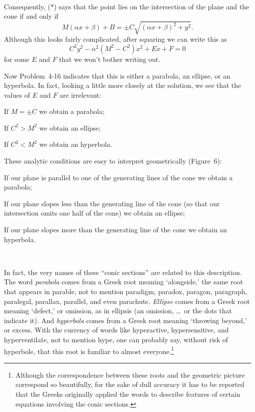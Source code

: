 \begin{center}
\\[0.6em]
\end{center}

Consequently, ($*$) says that the point lies on the intersection of the plane
and the cone if and only if
\[
M(\alpha x+\beta)+B=\pm C\sqrt{(\alpha x+\beta)^2+y^2}.
\]
Although this looks fairly complicated, after squaring we can write this as
\[
C^2y^2-\alpha^2(M^2-C^2)x^2+Ex+F=0
\]
for some $E$ and $F$ that we won't bother writing out.

Now Problem~4-16 indicates that this is either a parabola, an ellipse, or an
hyperbola. In fact, looking a little more closely at the solution, we see that
the values of $E$ and $F$ are irrelevant:
\begin{steps}
\item If $M=\pm C$ we obtain a parabola;
\item If $C^2>M^2$ we obtain an ellipse;
\item If $C^2<M^2$ we obtain an hyperbola.
\end{steps}
These analytic conditions are easy to interpret geometrically (Figure~6):
\begin{steps}
\item If our plane is parallel to one of the generating lines of the cone we
  obtain a parabola;
\item If our plane slopes less than the generating line of the cone (so that
  our intersection omits one half of the cone) we obtain an ellipse;
\item If our plane slopes more than the generating line of the cone we obtain
  an hyperbola.
\end{steps}

\begin{center}
\\[0.6em]
\end{center}

In fact, the very names of these ``conic sections'' are related to this
description. The word \emph{parabola} comes from a Greek root meaning
`alongside,' the same root that appears in parable, not to mention paradigm,
paradox, paragon, paragraph, paralegal, parallax, parallel, and even parachute.
\emph{Ellipse} comes from a Greek root meaning `defect,' or omission, as in
ellipsis (an omission, \ldots\ or the dots that indicate it). And
\emph{hyperbola} comes from a Greek root meaning `throwing beyond,' or excess.
With the currency of words like hyperactive, hypersensitive, and
hyperventilate, not to mention hype, one can probably say, without risk of
hyperbole, that this root is familiar to almost everyone.\footnote{Although the
correspondence between these roots and the geometric picture correspond so
beautifully, for the sake of dull accuracy it has to be reported that the
Greeks originally applied the words to describe features of certain equations
involving the conic sections.}

